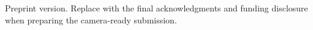 \begin{ack}
Preprint version. Replace with the final acknowledgments and funding disclosure when preparing the
camera-ready submission.
\end{ack}
